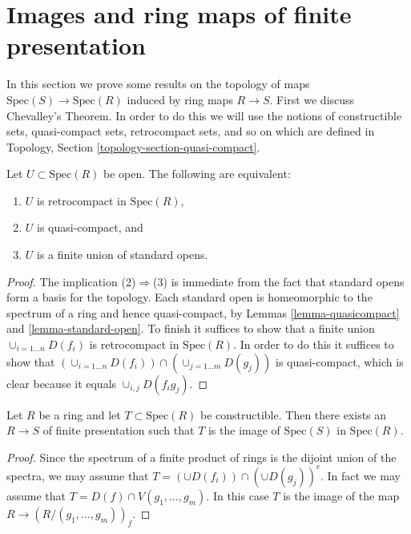 \section{Images and ring maps of finite presentation}
\label{section-images-finite-presentation}

\noindent
In this section we prove some results on the 
topology of maps $\text{Spec}(S) \to \text{Spec}(R)$
induced by ring maps $R \to S$. First we discuss Chevalley's Theorem.
In order to do this we will use the notions of constructible sets,
quasi-compact sets, retrocompact sets, and so on
which are defined in Topology, Section \ref{topology-section-quasi-compact}.

\begin{lemma}
\label{lemma-qc-open}
Let $U \subset \text{Spec}(R)$ be open. The following
are equivalent:
\begin{enumerate}
\item $U$ is retrocompact in $\text{Spec}(R)$,
\item $U$ is quasi-compact, and
\item $U$ is a finite union of standard opens.
\end{enumerate}
\end{lemma}

\begin{proof}
The implication (2)$\Rightarrow$(3) is immediate from the fact that standard
opens form a basis for the topology. Each standard open is
homeomorphic to the spectrum of a ring and hence quasi-compact,
by Lemmas \ref{lemma-quasicompact} and \ref{lemma-standard-open}.
To finish it suffices to show that a finite union
$\cup_{i=1\ldots n} D(f_i)$ is retrocompact in $\text{Spec}(R)$.
In order to do this it suffices to show that 
$(\cup_{i=1\ldots n} D(f_i)) \cap (\cup_{j=1\ldots m} D(g_j))$
is quasi-compact, which is clear because it equals
$\cup_{i,j} D(f_i g_j)$.
\end{proof}

\begin{lemma}
\label{lemma-constructible-is-image}
Let $R$ be a ring and let $T \subset \text{Spec}(R)$
be constructible. Then there exists an $R \to S$ of
finite presentation such that $T$ is the image of
$\text{Spec}(S)$ in $\text{Spec}(R)$.
\end{lemma}

\begin{proof}
Since the spectrum of a finite product of rings 
is the dijoint union of the spectra, we may assume
that $T = (\cup D(f_i)) \cap (\cup D(g_j))^c$.
In fact we may assume that $T = D(f) \cap V(g_1,\ldots,g_m)$.
In this case $T$ is the image of the map
$R \to (R/(g_1,\ldots,g_m))_f$.
\end{proof}

